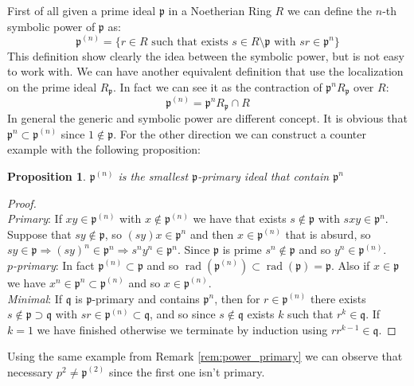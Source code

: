 \documentclass[notitlepage, a4]{book}
\theoremstyle{plain}
\newtheorem{prop}[teo]{Proposition}
\theoremstyle{remark}
\theoremstyle{definition}
\newcommand{\p}{\mathfrak{p}}
\newcommand{\q}{\mathfrak{q}}
\DeclareMathOperator{\rad}{rad}
\newcounter{que}
\begin{document}
%	
%		
	First of all given a prime ideal $ \p $ in a Noetherian Ring $ R $ we can define the $ n $-th symbolic power of $ \p $ as:
	\begin{equation}\label{eq:sym_pow_p1}
		\p^{(n)} = \{ r \in R \text{ such that exists } s \in R \setminus \p \text{ with } sr \in \p^n \}
	\end{equation}
	This definition show clearly the idea between the symbolic power, but is not easy to work with. We can have another equivalent definition that use the localization on the prime ideal $ R_\p $. In fact we can see it as the contraction of $ \p^n R_\p $ over $ R $:
	\begin{equation}\label{eq:sym_pow_p2}
		\p^{(n)} = \p^n R_\p \cap R
	\end{equation}
	In general the generic and symbolic power are different concept. It is obvious that $ \p^{n} \subset \p^{(n)} $ since $ 1 \not \in \p $. For the other direction we can construct a counter example with the following proposition:
	\begin{prop}\label{prop:sym_is_primary}
		$ \p^{(n)} $ is the smallest $ \p $-primary ideal that contain $ \p^n $
	\end{prop}
	\begin{proof}\quad \\
		\textit{Primary}: If $ xy \in  \p^{(n)}$ with $ x \not \in  \p^{(n)}$ we have that exists $ s \not \in \p $ with $ sxy \in \p^n $. Suppose that $ sy \not \in \p $, so $ (sy)x \in \p^n $ and then $ x \in \p^{(n)} $ that is absurd, so $ sy \in \p \Rightarrow (sy)^n \in \p^n \Rightarrow s^n y^n \in \p^n$. Since $ \p $ is prime $ s^n \not \in \p $ and so $ y^n \in \p^{(n)} $. \\
		\textit{$p$-primary}: In fact $ \p^{(n)} \subset \p $ and so $  \rad  (\p^{(n)} )\subset \rad (\p) = \p$. Also if $ x \in \p $ we have $ x^n \in \p^n \subset \p^{(n)}  $ and so $ x \in \p^{(n)}  $.\\
		\textit{Minimal}: If $ \q $ is $ \p $-primary and contains $ \p^n $, then for $ r \in \p^{(n)}  $ there exists $ s \not \in \p \supset \q $ with $ sr \in \p^{(n)}  \subset \q $, and so since $ s \not \in \q  $ exists $ k $ such that $ r^k \in \q $. If $ k=1 $ we have finished otherwise we terminate by induction using $ r r^{k-1} \in \q $.
	\end{proof}
	Using the same example from Remark \ref{rem:power_primary} we can observe that necessary $ p^2 \neq \p^{(2)}  $ since the first one isn't primary. 
	
\end{document}
